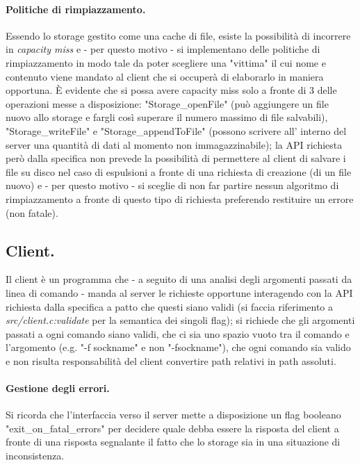 \documentclass[11pt, italian, openany]{book}
\begin{document}
\begin{sloppypar}
\paragraph{Politiche di rimpiazzamento.}
Essendo lo storage gestito come una cache di file, esiste la possibilit\`a di incorrere in \textit{capacity miss} e - per questo
motivo - si implementano delle politiche di rimpiazzamento in modo tale da poter scegliere una "vittima" il cui nome e contenuto
viene mandato al client che si occuper\`a di elaborarlo in maniera opportuna. \`E evidente che si possa avere capacity miss solo
a fronte di 3 delle operazioni messe a disposizione: "Storage\_openFile" (pu\`o aggiungere un file nuovo allo storage
e fargli cos\`i superare il numero massimo di file salvabili), "Storage\_writeFile" e "Storage\_appendToFile" (possono scrivere all'
interno del server una quantit\`a di dati al momento non immagazzinabile); la API richiesta per\`o dalla specifica non prevede la
possibilit\`a di permettere al client di salvare i file su disco nel caso di espulsioni a fronte di una richiesta di creazione
(di un file nuovo) e - per questo motivo - si sceglie di non far partire nessun algoritmo di rimpiazzamento a fronte di questo tipo
di richiesta preferendo restituire un errore (non fatale).

\subsection{Client.}
Il client \`e un programma che - a seguito di una analisi degli argomenti passati da linea di comando - manda al server le richieste
opportune interagendo con la API richiesta dalla specifica a patto che questi siano validi (si faccia riferimento a 
\textit{src/client.c:validate} per la semantica dei singoli flag); si richiede che gli argomenti passati a ogni comando siano validi,
che ci sia uno spazio vuoto tra il comando e l'argomento (e.g. "-f sockname" e non "-fsockname"), che ogni comando sia valido e non
risulta responsabilit\`a del client convertire path relativi in path assoluti.

\paragraph{Gestione degli errori.}
Si ricorda che l'interfaccia verso il server mette a disposizione un flag booleano "exit\_on\_fatal\_errors" per decidere quale
debba essere la risposta del client a fronte di una risposta segnalante il fatto che lo storage sia in una situazione di inconsistenza.


\end{sloppypar}
\end{document}
